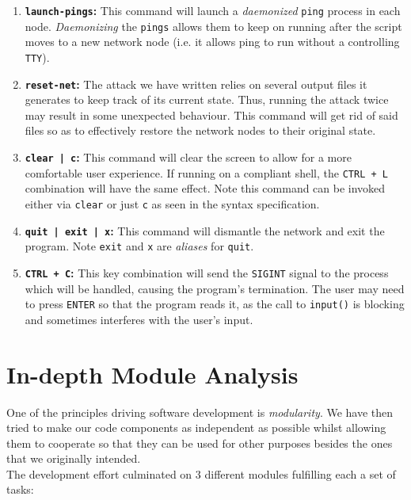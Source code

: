 \begin{enumerate}
                    \item \textbf{\texttt{launch-pings}:} This command will launch a \textit{daemonized} \texttt{ping} process in each node. \textit{Daemonizing} the \texttt{pings} allows them to keep on running after the script moves to a new network node (i.e. it allows ping to run without a controlling \texttt{TTY}).
                    \item \textbf{\texttt{reset-net}:} The attack we have written relies on several output files it generates to keep track of its current state. Thus, running the attack twice may result in some unexpected behaviour. This command will get rid of said files so as to effectively restore the network nodes to their original state.
                    \item \textbf{\texttt{clear | c}:} This command will clear the screen to allow for a more comfortable user experience. If running on a compliant shell, the \texttt{CTRL + L} combination will have the same effect. Note this command can be invoked either via \texttt{clear} or just \texttt{c} as seen in the syntax specification.
                    \item \textbf{\texttt{quit | exit | x}:} This command will dismantle the network and exit the program. Note \texttt{exit} and \texttt{x} are \textit{aliases} for \texttt{quit}.
                    \item \textbf{\texttt{CTRL + C}:} This key combination will send the \texttt{SIGINT} signal to the process which will be handled, causing the program's termination. The user may need to press \texttt{ENTER} so that the program reads it, as the call to \texttt{input()} is blocking and sometimes interferes with the user's input.
                \end{enumerate}

    \section{In-depth Module Analysis}
        One of the principles driving software development is \textit{modularity}. We have then tried to make our code components as independent as possible whilst allowing them to cooperate so that they can be used for other purposes besides the ones that we originally intended.\\

        The development effort culminated on $3$ different modules fulfilling each a set of tasks:


